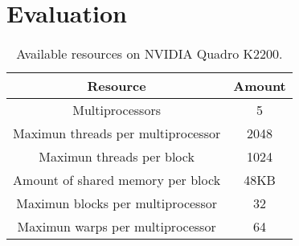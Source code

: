 \section{Evaluation}
\label{sec:evaluation} 

\begin{table}[htb]
\centering
 \begin{tabular}{||c | c||} 
 \hline
 Resource & Amount \\ [0.8ex] 
 \hline\hline
 Multiprocessors & 5 \\ 
 Maximun threads per multiprocessor & 2048 \\
 Maximun threads per block & 1024 \\
 Amount of shared memory per block & 48KB \\
 Maximun blocks per multiprocessor & 32 \\
 Maximun warps per multiprocessor & 64 \\ [1ex]
 \hline
 \end{tabular}
\caption{Available resources on NVIDIA Quadro K2200.}
\label{table:2}
\end{table}